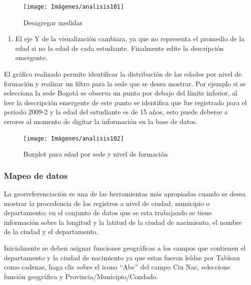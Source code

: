 \documentclass[
]{book}
\providecommand{\tightlist}{%
  \setlength{\itemsep}{0pt}\setlength{\parskip}{0pt}}
\begin{document}
\begin{figure}

{\centering \texttt{[image: Imágenes/analisis101]} 

}

\caption{Desagregar medidas}\label{fig:paso8boxplot-fig}
\end{figure}

\begin{enumerate}
\def\labelenumi{\arabic{enumi}.}
\setcounter{enumi}{8}
\tightlist
\item
  El eje Y de la visualización cambiara, ya que no representa el promedio de la edad si no la edad de cada estudiante. Finalmente edite la descripción emergente.
\end{enumerate}

El gráfico realizado permite identificar la distribución de las edades por nivel de formación y realizar un filtro para la sede que se desea mostrar. Por ejemplo si se selecciona la sede Bogotá se observa un punto por debajo del límite inferior, al leer la descripción emergente de este punto se identifica que fue registrado para el periodo 2009-2 y la edad del estudiante es de 15 años, esto puede deberse a errores al momento de digitar la información en la base de datos.

\begin{figure}

{\centering \texttt{[image: Imágenes/analisis102]} 

}

\caption{Boxplot para edad por sede y nivel de formación}\label{fig:boxplot-fig}
\end{figure}

\hypertarget{mapeodatos}{%
\subsubsection{Mapeo de datos}\label{mapeodatos}}

La georreferenciación es una de las herramientas más apropiadas cuando se desea mostrar la procedencia de los registros a nivel de ciudad, municipio o departamento; en el conjunto de datos que se esta trabajando se tiene información sobre la longitud y la latitud de la ciudad de nacimiento, el nombre de la ciudad y el departamento.

Inicialmente se deben asignar funciones geográficas a los campos que contienen el departamento y la ciudad de nacimiento ya que estas fueron leídas por Tableau como cadenas, haga clic sobre el icono ``Abc'' del campo Ciu Nac, seleccione función geográfica y Provincia/Municipio/Condado.
\end{document}
